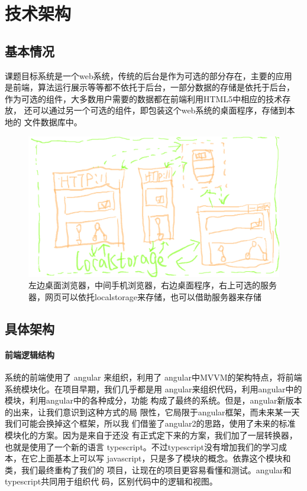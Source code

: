 \section{技术架构}
\subsection{基本情况}
课题目标系统是一个web系统，传统的后台是作为可选的部分存在，主要的应用
是前端，算法运行展示等等都不依托于后台，一部分数据的存储是依托于后台，
作为可选的组件，大多数用户需要的数据都在前端利用HTML5中相应的技术存放，
还可以通过另一个可选的组件，即包装这个web系统的桌面程序，存储到本地的
文件数据库中。
      \begin{figure}[!htb]
      	\centering
      	\includegraphics[width=0.7\linewidth]{img/structure.png}
      	\caption{左边桌面浏览器，中间手机浏览器，右边桌面程序，右上可选的服务器，网页可以依托localstorage来存储，也可以借助服务器来存储}
      	\label{fig:structure.png}
      \end{figure}
\subsection{具体架构}
\paragraph{前端逻辑结构} 系统的前端使用了 angular 来组织，利用了
angular中MVVM的架构特点，将前端系统模块化。在项目早期，我们几乎都是用
angular来组织代码，利用angular中的模块，利用angular中的各种成分，功能
构成了最终的系统。但是，angular新版本的出来，让我们意识到这种方式的局
限性，它局限于angular框架，而未来某一天我们可能会换掉这个框架，所以我
们借鉴了angular2的思路，使用了未来的标准模块化的方案。因为是来自于还没
有正式定下来的方案，我们加了一层转换器，也就是使用了一个新的语言
typescript。不过typescript没有增加我们的学习成本，在它上面基本上可以写
javascript，只是多了模块的概念。依靠这个模块和类，我们最终重构了我们的
项目，让现在的项目更容易看懂和测试。angular和typescript共同用于组织代
码，区别代码中的逻辑和视图。
